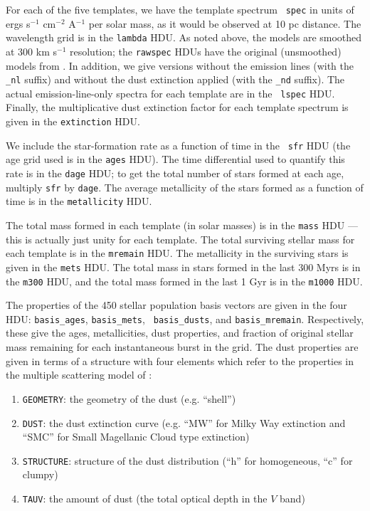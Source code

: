 \documentclass[10pt,preprint]{aastex}
\renewcommand{\AA}{A}
\begin{document}
For each of the five templates, we have the template spectrum {\tt
spec} in units of ergs s$^{-1}$ cm$^{-2}$ \AA$^{-1}$ per solar mass,
as it would be observed at 10 pc distance. The wavelength grid is in
the {\tt lambda} HDU. As noted above, the models are smoothed at 300
km s$^{-1}$ resolution; the {\tt rawspec} HDUs have the original
(unsmoothed) models from \citet{bruzual03a}. In addition, we give
versions without the emission lines (with the {\tt \_nl} suffix) and
without the dust extinction applied (with the {\tt \_nd} suffix). The
actual emission-line-only spectra for each template are in the {\tt
lspec} HDU. Finally, the multiplicative dust extinction factor for
each template spectrum is given in the {\tt extinction} HDU.

We include the star-formation rate as a function of time in the {\tt
sfr} HDU (the age grid used is in the {\tt ages} HDU). The time
differential used to quantify this rate is in the {\tt dage} HDU; to
get the total number of stars formed at each age, multiply {\tt sfr}
by {\tt dage}. The average metallicity of the stars formed as a
function of time is in the {\tt metallicity} HDU.

The total mass formed in each template (in solar masses) is in the
{\tt mass} HDU --- this is actually just unity for each template. The
total surviving stellar mass for each template is in the {\tt mremain}
HDU. The metallicity in the surviving stars is given in the {\tt mets}
HDU.  The total mass in stars formed in the last 300 Myrs is in the
{\tt m300} HDU, and the total mass formed in the last 1 Gyr is in the
{\tt m1000} HDU.

The properties of the 450 stellar population basis vectors are given
in the four HDU: {\tt basis\_ages}, {\tt basis\_mets}, {\tt
basis\_dusts}, and {\tt basis\_mremain}. Respectively, these give the
ages, metallicities, dust properties, and fraction of original stellar
mass remaining for each instantaneous burst in the grid. The dust 
properties are given in terms of a structure with four elements which
refer to the properties in the multiple scattering model of \citet{witt00a}:
\begin{enumerate}
\item {\tt GEOMETRY}: the geometry of the dust (e.g. ``shell'') 
\item {\tt DUST}: the dust extinction curve (e.g. ``MW'' for Milky
	Way extinction and ``SMC'' for Small Magellanic Cloud type
	extinction) 
\item {\tt STRUCTURE}: structure of the dust distribution (``h'' for
	homogeneous, ``c'' for clumpy)
\item {\tt TAUV}: the amount of dust (the total optical depth in the
	$V$ band)
\end{enumerate}

\newpage




\end{document}
